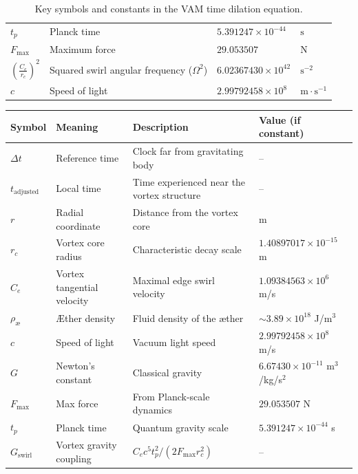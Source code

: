 \begin{table}[H]
\begin{tabular}{llll}
        $t_p$ & Planck time & $5.391247 \times 10^{-44}$ & $\text{s}$ \\
        $F_{\max}$ & Maximum force & $29.053507$ & $\text{N}$ \\
        $\left(\frac{C_e}{r_c}\right)^2$ & Squared swirl angular frequency ($\Omega^2$) & $6.02367430 \times 10^{42}$ & $\text{s}^{-2}$ \\
        $c$ & Speed of light & $2.99792458 \times 10^8$ & $\text{m}\cdot\text{s}^{-1}$ \\
          \bottomrule
      \end{tabular}
    \caption{Key symbols and constants in the VAM time dilation equation.}
      \label{tab:time_dilation_symbols}
  \end{table}

\begin{table}[H]
    \centering
    \footnotesize
    \begin{tabular}{llll}
        \toprule
        \textbf{Symbol} & \textbf{Meaning} & \textbf{Description} & \textbf{Value (if constant)} \\
        \midrule
        $\Delta t$ & Reference time & Clock far from gravitating body & -- \\
        $t_\text{adjusted}$ & Local time & Time experienced near the vortex structure & -- \\
        $r$ & Radial coordinate & Distance from the vortex core & m \\
        $r_c$ & Vortex core radius & Characteristic decay scale & $1.40897017 \times 10^{-15}$ m \\
        $C_e$ & Vortex tangential velocity & Maximal edge swirl velocity & $1.09384563 \times 10^6$ m/s \\
        $\rho_\text{\ae}$ & Æther density & Fluid density of the æther & $\sim 3.89 \times 10^{18}$ J/m$^3$ \\
        $c$ & Speed of light & Vacuum light speed & $2.99792458 \times 10^8$ m/s \\
        $G$ & Newton's constant & Classical gravity & $6.67430 \times 10^{-11}$ m$^3$/kg/s$^2$ \\
        $F_{\text{max}}$ & Max force & From Planck-scale dynamics & $29.053507$ N \\
        $t_p$ & Planck time & Quantum gravity scale & $5.391247 \times 10^{-44}$ s \\
        $G_\text{swirl}$ & Vortex gravity coupling & $C_e c^5 t_p^2 / (2 F_{\text{max}} r_c^2)$ & -- \\

\end{tabular}
\end{table}
